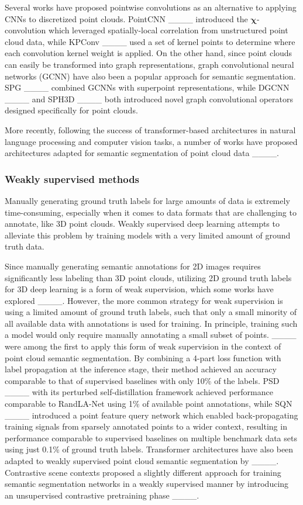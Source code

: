 Several works have proposed pointwise convolutions as an alternative to applying CNNs to discretized point clouds. PointCNN ____ introduced the $\bm{\chi}$-convolution which leveraged spatially-local correlation from unstructured point cloud data, while KPConv ____ used a set of kernel points to determine where each convolution kernel weight is applied. On the other hand, since point clouds can easily be transformed into graph representations, graph convolutional neural networks (GCNN) have also been a popular approach for semantic segmentation. SPG ____ combined GCNNs with superpoint representations, while DGCNN ____ and SPH3D ____ both introduced novel graph convolutional operators designed specifically for point clouds.

More recently, following the success of transformer-based architectures in natural language processing and computer vision tasks, a number of works have proposed architectures adapted for semantic segmentation of point cloud data ____.

\subsubsection{Weakly supervised methods}

Manually generating ground truth labels for large amounts of data is extremely time-consuming, especially when it comes to data formats that are challenging to annotate, like 3D point clouds. Weakly supervised deep learning attempts to alleviate this problem by training models with a very limited amount of ground truth data.

Since manually generating semantic annotations for 2D images requires significantly less labeling than 3D point clouds, utilizing 2D ground truth labels for 3D deep learning is a form of weak supervision, which some works have explored ____. However, the more common strategy for weak supervision is using a limited amount of ground truth labels, such that only a small minority of all available data with annotations is used for training. In principle, training such a model would only require manually annotating a small subset of points. ____ were among the first to apply this form of weak supervision in the context of point cloud semantic segmentation. By combining a 4-part loss function with label propagation at the inference stage, their method achieved an accuracy comparable to that of supervised baselines with only 10\% of the labels. PSD ____ with its perturbed self-distillation framework achieved performance comparable to RandLA-Net using 1\% of available point annotations, while SQN ____ introduced a point feature query network which enabled back-propagating training signals from sparsely annotated points to a wider context, resulting in performance comparable to supervised baselines on multiple benchmark data sets using just 0.1\% of ground truth labels. Transformer architectures have also been adapted to weakly supervised point cloud semantic segmentation by ____. Contrastive scene contexts proposed a slightly different approach for training semantic segmentation networks in a weakly supervised manner by introducing an unsupervised contrastive pretraining phase ____.

